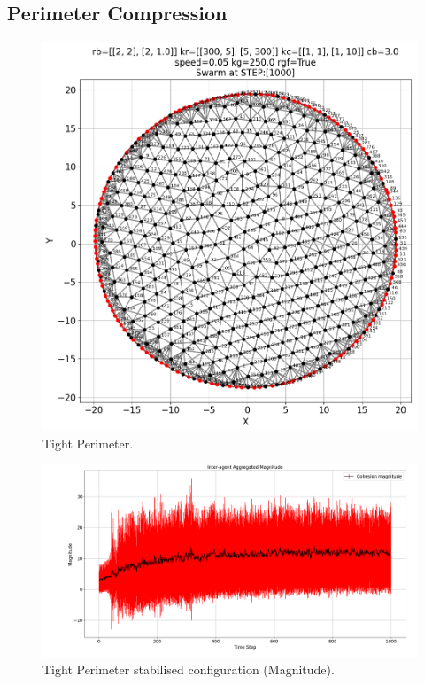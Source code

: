 \documentclass[12pt,a4paper]{IEEEtran}
\begin{document}
\subsection{Perimeter Compression}

\begin{figure}[ht]
	\begin{center}
		\includegraphics[width=1.0\linewidth]{figures/tightPerim}
	\end{center}
	\caption{Tight Perimeter. \label{fig:tightPerim}}
\end{figure}

\begin{figure}[H]
	\begin{center}
		\includegraphics[width=1.0\linewidth]{figures/tightPerimMagnitude}
	\end{center}
	\caption{Tight Perimeter stabilised configuration (Magnitude). \label{fig:tightPerimMagnitude}}
\end{figure}
\end{document}
